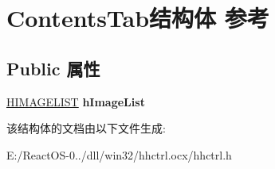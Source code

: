 \hypertarget{struct_contents_tab}{}\section{Contents\+Tab结构体 参考}
\label{struct_contents_tab}
\subsection*{Public 属性}
\begin{DoxyCompactItemize}
\item 
\mbox{\label{struct_contents_tab_a95d20b651ac9f922c6ce8b89e614c0cc}} 
\hyperlink{struct___i_m_a_g_e_l_i_s_t}{H\+I\+M\+A\+G\+E\+L\+I\+ST} {\bfseries h\+Image\+List}
\end{DoxyCompactItemize}


该结构体的文档由以下文件生成\+:\begin{DoxyCompactItemize}
\item 
E\+:/\+React\+O\+S-\/0../dll/win32/hhctrl.\+ocx/hhctrl.\+h\end{DoxyCompactItemize}
